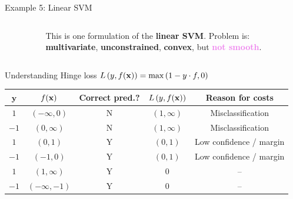 \documentclass[11pt,compress,t,notes=noshow, xcolor=table]{beamer}
\begin{document}
\begin{vbframe}{Example 5: Linear SVM}
\begin{columns}[T]
\begin{column}{.3\textwidth}
\begin{figure}
\begin{center}
	\end{center}
		\end{figure}
	\end{column}
	\begin{column}{.3\textwidth}
	\vspace*{0.6cm}
	\begin{footnotesize}
	This is one formulation of the \textbf{linear SVM}. Problem is: \textbf{multivariate}, \textbf{unconstrained}, \textbf{convex}, but \textcolor{violet}{\textbf{not smooth}}.  
	\end{footnotesize}
	\end{column}
\end{columns}


\framebreak 

Understanding Hinge loss $L\left(y, f(\mathbf{x})\right) = \max\left(1 - y\cdot f, 0\right)$

\begin{footnotesize}
\begin{center}
\begin{tabular}{ c | c | c | c | c }
$\mathbf{y}$ & $f(\mathbf{x})$ &  \textbf{Correct pred.?}  & $L\left(y, f(\mathbf{x})\right)$ & \textbf{Reason for costs}  \\ \hline
 $1$ & $(- \infty, 0)$  & N & $(1, \infty)$ & Misclassification \\
 $- 1$ & $(0, \infty)$ & N  & $(1, \infty)$ &  Misclassification \\
 $1$ & $(0, 1)$ & Y & $(0, 1)$ & Low confidence / margin \\
 $- 1$ & $(-1, 0)$  & Y  & $(0, 1)$& Low confidence / margin\\
 $1$ & $(1, \infty)$ &  Y & $0$ & -- \\
 $- 1$ & $(- \infty, -1)$ &  Y & $0$ & -- \\
\end{tabular}
\end{center}
\end{footnotesize}

\vspace*{-0.3cm}


\end{vbframe}
\end{document}
